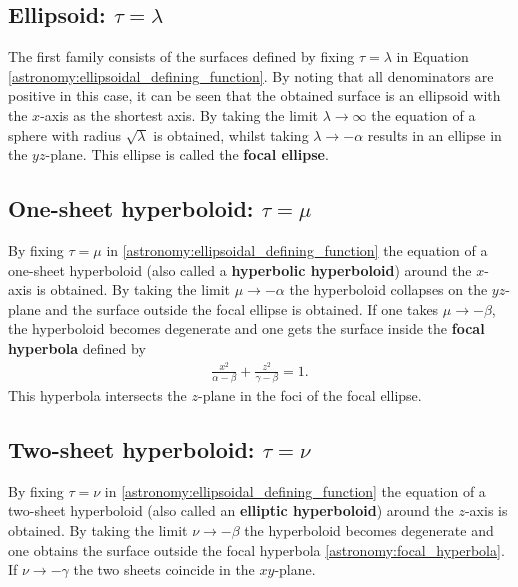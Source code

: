 \subsection{Ellipsoid: \texorpdfstring{$\tau=\lambda$}{tau equals lambda}}

    The first family consists of the surfaces defined by fixing $\tau=\lambda$ in Equation \eqref{astronomy:ellipsoidal_defining_function}. By noting that all denominators are positive in this case, it can be seen that the obtained surface is an ellipsoid with the $x$-axis as the shortest axis. By taking the limit $\lambda\longrightarrow\infty$ the equation of a sphere with radius $\sqrt{\lambda}$ is obtained, whilst taking $\lambda\longrightarrow-\alpha$ results in an ellipse in the $yz$-plane. This ellipse is called the \textbf{focal ellipse}.

\subsection{One-sheet hyperboloid: \texorpdfstring{$\tau=\mu$}{tau equals mu}}

    By fixing $\tau=\mu$ in \eqref{astronomy:ellipsoidal_defining_function} the equation of a one-sheet hyperboloid (also called a \textbf{hyperbolic hyperboloid}) around the $x$-axis is obtained. By taking the limit $\mu\longrightarrow-\alpha$ the hyperboloid collapses on the $yz$-plane and the surface outside the focal ellipse is obtained. If one takes $\mu\longrightarrow-\beta$, the hyperboloid becomes degenerate and one gets the surface inside the \textbf{focal hyperbola} defined by
    \begin{gather}
        \label{astronomy:focal_hyperbola}
        \frac{x^2}{\alpha-\beta} + \frac{z^2}{\gamma-\beta} = 1.
    \end{gather}
    This hyperbola intersects the $z$-plane in the foci of the focal ellipse.

\subsection{Two-sheet hyperboloid: \texorpdfstring{$\tau = \nu$}{}}

    By fixing $\tau=\nu$ in \eqref{astronomy:ellipsoidal_defining_function} the equation of a two-sheet hyperboloid (also called an \textbf{elliptic hyperboloid}) around the $z$-axis is obtained. By taking the limit $\nu\longrightarrow-\beta$ the hyperboloid becomes degenerate and one obtains the surface outside the focal hyperbola \eqref{astronomy:focal_hyperbola}. If $\nu\longrightarrow-\gamma$ the two sheets coincide in the $xy$-plane.

